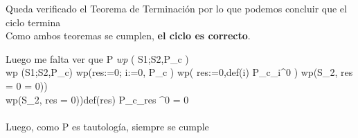 \documentclass[10pt,a4paper]{article}
\begin{document}
Queda verificado el Teorema de Terminación por lo que podemos concluir que el
ciclo termina\\ Como ambos teoremas se cumplen, \textbf{el ciclo es correcto}.
\vspace{0.5cm}

\item Luego me falta ver que P \implica \textit{wp} \left( S1;S2,P_{c} \right) \\

wp \left(S1;S2,P_{c}\right) \equiv wp\left(res:=0; i:=0, P_{c} \right) \equiv
wp\left( res:=0,def(i) \yLuego P_{c}\space_{i}^{0} \right) \equiv wp(S_{2}, res
= 0  = 0)) \\ \equiv wp(S_{2}, \True \yLuego res = 0))\equiv def(res)
\yLuego P_{c}\space_{res} ^{0}  = 0 \equiv \True \\

\\ Luego, como P \implica \space \True \space es tautología, siempre se cumple
\end{document}

